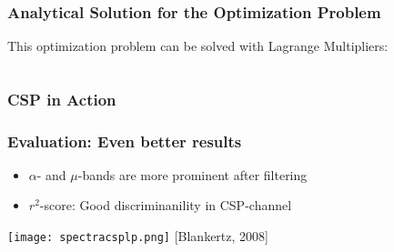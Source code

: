 \documentclass{beamer}
\begin{document}
\begin{frame}
\frametitle{Analytical Solution for the Optimization Problem}
	This optimization problem can be solved with Lagrange Multipliers:
	\begin{columns}
	\begin{column}{0.9\textwidth}
	\begin{block}
	\begin{block}
	\begin{block}
	\begin{block}
	\end{block} \end{block} \end{block} \end{block}		
	\end{column}
	\end{columns}
\end{frame}

\begin{frame}
\frametitle{CSP in Action}
	\centering
\end{frame}

\begin{frame}
\frametitle{Evaluation: Even better results}
	\begin{itemize}
	\item $\alpha$- and $\mu$-bands are more prominent after filtering
	\item $r^2$-score: Good discriminanility in CSP-channel
	\end{itemize}
	\texttt{[image: spectracsplp.png]}
	{\tiny [Blankertz, 2008]}
\end{frame}
\end{document}
